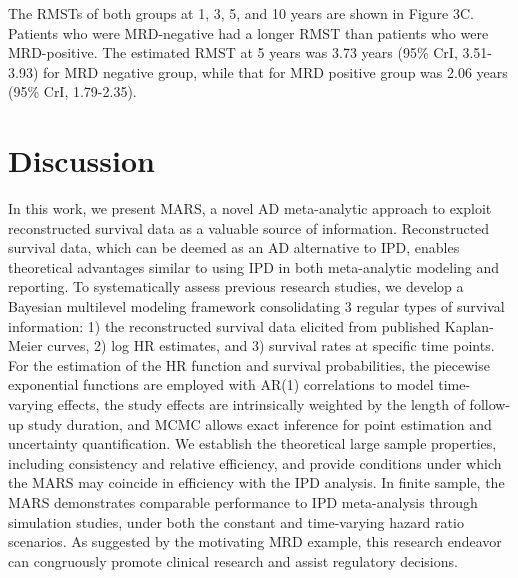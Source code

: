 \documentclass[12pt]{article}
\theoremstyle{mystyle}
\begin{document}

The RMSTs of both groups at 1, 3, 5, and 10 years are shown in Figure 3C. Patients who were MRD-negative had a longer RMST than patients who were MRD-positive.  The estimated RMST at 5 years was 3.73 years (95\% CrI, 3.51-3.93) for MRD negative group, while that for MRD positive group was 2.06 years (95\% CrI, 1.79-2.35). 



\section{Discussion}
\label{sec:8}

In this work, we present MARS, a novel AD meta-analytic approach to exploit reconstructed survival data as a valuable source of information. 
Reconstructed survival data, which can be deemed as an AD alternative to IPD, enables theoretical advantages similar to using IPD in both meta-analytic modeling and reporting.
To systematically assess previous research studies, we develop a Bayesian multilevel modeling framework consolidating 3 regular types of survival information: 1) the reconstructed survival data elicited from published Kaplan-Meier curves, 2) log HR estimates, and 3) survival rates at specific time points. For the estimation of the HR function and survival probabilities, the piecewise exponential functions are employed with AR(1) correlations to model time-varying effects, the study effects are intrinsically weighted by the length of follow-up study duration, and MCMC allows exact inference for point estimation and uncertainty quantification.   
We establish the theoretical large sample properties, including consistency and relative efficiency, and provide conditions under which the MARS may coincide in efficiency with the IPD analysis. 
In finite sample, the MARS demonstrates comparable performance to IPD meta-analysis through simulation studies, under both the constant and time-varying hazard ratio scenarios.
As suggested by the motivating MRD example, this research endeavor can congruously
promote clinical research and assist regulatory decisions.
\end{document}
